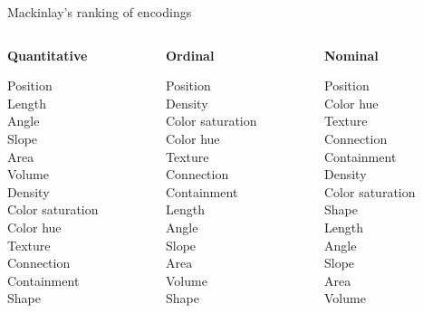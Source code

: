 \documentclass[xcolor=table,aspectratio=169]{beamer}
\begin{document}
\begin{frame}{Mackinlay’s ranking of encodings}
  \begin{columns}
    \begin{column}[T]{.3\textwidth}
      \textbf{Quantitative}\medskip

      Position\\
      Length\\
      Angle\\
      Slope\\
      Area\\
      Volume\\
      Density\\
      Color saturation\\
      Color hue\\
      Texture\\
      Connection\\
      Containment\\
      Shape
    \end{column}
    \begin{column}[T]{.3\textwidth}
      \textbf{Ordinal}\medskip
      
      Position\\
      Density\\
      Color saturation\\
      Color hue\\
      Texture\\
      Connection\\
      Containment\\
      Length\\
      Angle\\
      Slope\\
      Area\\
      Volume\\
      Shape
    \end{column}
    \begin{column}[T]{.3\textwidth}
      \textbf{Nominal}\medskip

            Position\\
            Color hue\\
            Texture\\
      Connection\\
      Containment\\         
            Density\\
      Color saturation\\
      Shape\\
      Length\\
      Angle\\
      Slope\\
      Area\\
      Volume

    \end{column}

  \end{columns}
\end{frame}
\end{document}
